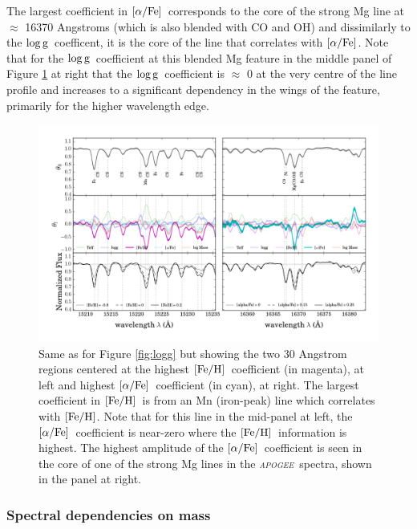 \documentclass[12pt, preprint]{aastex}
\newcommand{\project}[1]{\textsl{#1}}
\newcommand{\apogee}{\project{\textsc{apogee}}}
\newcommand{\feh}{\mbox{$\rm [Fe/H]$}}
\newcommand{\alphafe}{\mbox{$\rm [\alpha/Fe]$}}
\newcommand{\logg}{\mbox{$\rm \log g$}}
\begin{document}
The largest coefficient in \alphafe\ corresponds to the core of the strong Mg line at $\approx$ 16370 Angstroms (which is also blended with CO and OH) and dissimilarly to the \logg\ coefficent, it is the core of the line that correlates with \alphafe. Note that for the \logg\ coefficient at this blended Mg feature in the middle panel of Figure \ref{fig:feha} at right that the \logg\ coefficient is $\approx$ 0 at the very centre of the line profile and increases to a significant dependency in the wings of the feature, primarily for the higher wavelength edge. 


\begin{figure}[p]
\centering
    \includegraphics[scale=0.51]{./plots/coeffs_af_3.png}
  \caption{Same as for Figure \ref{fig:logg} but showing the two 30 Angstrom regions centered at the highest \feh\ coefficient (in magenta), at left and highest \alphafe\ coefficient (in cyan), at right. The largest coefficient in \feh\ is from an Mn (iron-peak) line which correlates with \feh. Note that for this line in the mid-panel at left, the \alphafe\ coefficient is near-zero where the \feh\ information is highest. The highest amplitude of the \alphafe\ coefficient is seen in the core of one of the strong Mg lines in the \apogee\ spectra, shown in the panel at right.}
\label{fig:feha}
\end{figure}



\subsubsection{Spectral dependencies on mass} 
\end{document}
